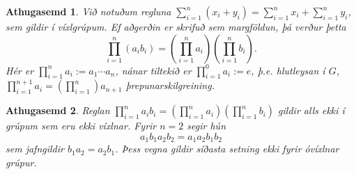 \documentclass[a4paper,icelandic,11pt]{book}
\theoremstyle{plain}
\newtheorem*{ath}{Athugasemd}
\begin{document}
\begin{ath}
  Við notuðum regluna $\sum_{i=1}^{n}(x_i+y_i) = \sum_{i=1}^{n} x_i +
  \sum_{i=1}^{n}y_i$, sem gildir í víxlgrúpum. Ef aðgerðin er skrifuð sem
  margföldun, þá verður þetta 
\begin{equation*}
  \prod_{i=1}^n (a_i b_i)
  = \left( \prod_{i=1}^n a_i \right)\left( \prod_{i=1}^n b_i \right).
\end{equation*}
Hér er $\prod_{i=1}^n a_i := a_1\cdots a_n$, nánar tiltekið er 
$\prod_{i=1}^0 a_i := e$, þ.e. hlutleysan í $G$, $\prod_{i=1}^{n+1}a_i =
\left(\prod_{i=1}^n\right)a_{n+1}$ þrepunarskilgreining.
\end{ath}
\begin{ath}
  Reglan $\prod_{i=1}^n a_ib_i = \left( \prod_{i=1}^n a_i \right)\left(
  \prod_{i=1}^n b_i \right)$ gildir \emph{alls ekki} í grúpum sem eru ekki
  víxlnar. Fyrir $n=2$ segir hún
  \[
   a_1 b_1 a_2 b_2 = a_1 a_2 b_1 b_2
  \]
  sem jafngildir $b_1 a_2 = a_2 b_1$. Þess vegna gildir síðasta setning ekki
  fyrir óvíxlnar grúpur. 
\end{ath}
\end{document}

